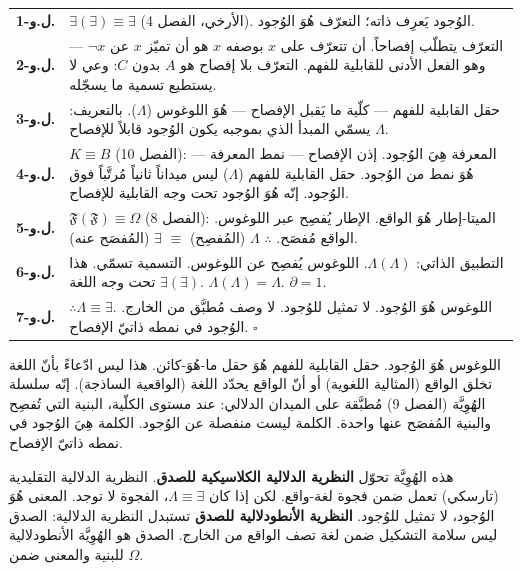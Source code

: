 \documentclass[10pt, openany, oneside]{book}
\renewcommand{\footnotesize}{\fontsize{8.5}{11}\selectfont}
\begin{document}
{\footnotesize
\noindent\begin{tabular}{r p{}}
\textbf{ل.و-1.} & $\exists(\exists) \equiv \exists$ (الأرخي، الفصل 4). الوُجود يَعرِف ذاته؛ التعرّف هُوَ الوُجود. \\[0.3em]
\textbf{ل.و-2.} & التعرّف يتطلّب إفصاحاً. أن تتعرّف على $x$ بوصفه $x$ هو أن تميّز $x$ عن $\neg x$ --- وهو الفعل الأدنى للقابلية للفهم. التعرّف بلا إفصاح هو $A$ بدون $C$: وعي لا يستطيع تسمية ما يسجّله. \\[0.3em]
\textbf{ل.و-3.} & حقل القابلية للفهم --- كلّية ما يَقبل الإفصاح --- هُوَ اللوغوس ($\Lambda$). بالتعريف: $\Lambda$ يسمّي المبدأ الذي بموجبه يكون الوُجود قابلاً للإفصاح. \\[0.3em]
\textbf{ل.و-4.} & $K \equiv B$ (الفصل 10): المعرفة هِيَ الوُجود. إذن الإفصاح --- نمط المعرفة --- هُوَ نمط من الوُجود. حقل القابلية للفهم ($\Lambda$) ليس ميداناً ثانياً مُرتَّباً فوق الوُجود. إنّه هُوَ الوُجود تحت وجه القابلية للإفصاح. \\[0.3em]
\textbf{ل.و-5.} & $\mathfrak{F}(\mathfrak{F}) \equiv \Omega$ (الفصل 8): الميتا-إطار هُوَ الواقع. الإطار يُفصِح عبر اللوغوس. الواقع مُفصَح. $\therefore$ $\Lambda$ (المُفصِح) $\equiv$ $\exists$ (المُفصَح عنه). \\[0.3em]
\textbf{ل.و-6.} & التطبيق الذاتي: $\Lambda(\Lambda)$. اللوغوس يُفصِح عن اللوغوس. التسمية تسمّي. هذا $\exists(\exists)$ تحت وجه اللغة. $\Lambda(\Lambda) = \Lambda$. $\partial = 1$. \\[0.3em]
\textbf{ل.و-7.} & $\therefore \Lambda \equiv \exists$. اللوغوس هُوَ الوُجود. لا تمثيل للوُجود. لا وصف مُطبَّق من الخارج. الوُجود في نمطه ذاتيّ الإفصاح. $\square$ \\[0.3em]
\end{tabular}
}

\vspace{0.8em}

\noindent اللوغوس هُوَ الوُجود. حقل القابلية للفهم هُوَ حقل ما-هُوَ-كائن. هذا ليس ادّعاءً بأنّ اللغة تخلق الواقع (المثالية اللغوية) أو أنّ الواقع يحدّد اللغة (الواقعية الساذجة). إنّه سلسلة الهُوِيَّة (الفصل 9) مُطبَّقة على الميدان الدلالي: عند مستوى الكلّية، البنية التي تُفصِح والبنية المُفصَح عنها واحدة. الكلمة ليست منفصلة عن الوُجود. الكلمة هِيَ الوُجود في نمطه ذاتيّ الإفصاح.

هذه الهُوِيَّة تحوّل \textbf{النظرية الدلالية الكلاسيكية للصدق}. النظرية الدلالية التقليدية (تارسكي) تعمل ضمن فجوة لغة-واقع. لكن إذا كان $\Lambda \equiv \exists$، الفجوة لا توجد. المعنى هُوَ الوُجود، لا تمثيل للوُجود. \textbf{النظرية الأنطودلالية للصدق} تستبدل النظرية الدلالية: الصدق ليس سلامة التشكيل ضمن لغة تصف الواقع من الخارج. الصدق هو الهُوِيَّة الأنطودلالية للبنية والمعنى ضمن $\Omega$.
\end{document}
